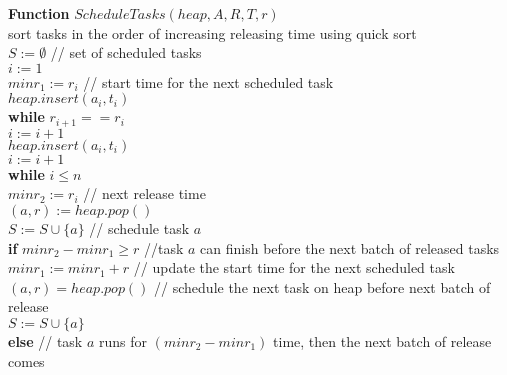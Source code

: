 \documentclass[11pt]{article}
\begin{document}
\begin{enumerate}
\begin{enumerate}
\textbf{Function} $ScheduleTasks(heap, A, R, T, r)$\\
\-\hspace{2em} sort tasks in the order of increasing releasing time
using quick sort\\
\-\hspace{2em} $S := \emptyset$ // set of scheduled tasks\\
\-\hspace{2em} $i := 1$ \\
\-\hspace{2em} $minr_1 := r_i$ // start time for the next scheduled task\\
\-\hspace{2em} $heap.insert(a_i,t_i)$ \\
\-\hspace{2em} \textbf{while} $r_{i+1} == r_i$\\
\-\hspace{4em} $i := i + 1$ \\
\-\hspace{4em} $heap.insert(a_i,t_i)$ \\
\-\hspace{2em} $i := i + 1$ \\
\-\hspace{2em} \textbf{while} $i \leq n$\\
\-\hspace{4em} $minr_2 := r_i$ // next release time\\
\-\hspace{4em} $(a,r) := heap.pop()$\\
\-\hspace{4em} $S := S \cup \{a\}$ // schedule task $a$\\
\-\hspace{4em} \textbf{if} $minr_2 - minr_1 \geq r$ //task $a$ can
finish before the next batch of released tasks\\
\-\hspace{6em} $minr_1 := minr_1 + r$ // update the start time for the
next scheduled task\\
\-\hspace{6em} $(a,r) = heap.pop()$ // schedule the next task on heap
before next batch of release \\
\-\hspace{6em} $S := S \cup \{a\}$\\
\-\hspace{4em} \textbf{else} // task $a$ runs for $(minr_2-minr_1)$
time, then the next batch of release comes\\

\end{enumerate}
\end{enumerate}
\end{document}
